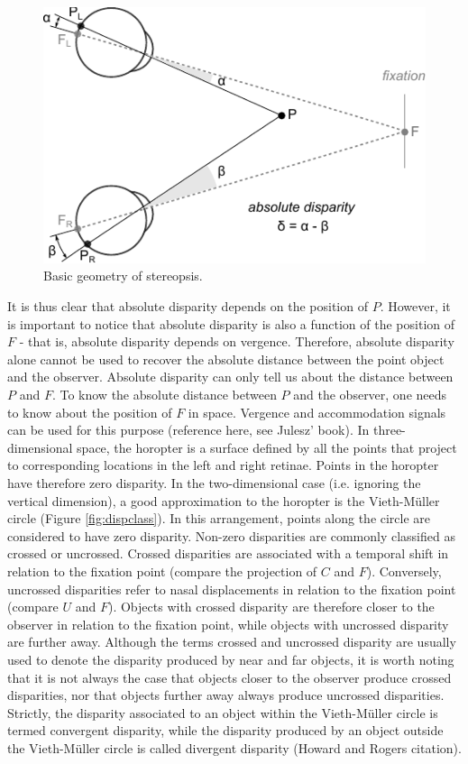 \documentclass[oneside,12pt]{classes/CUEDthesisPSnPDF}
\begin{document}
\begin{figure}
  \centering
  \includegraphics{absolute-disparity}
  \caption{Basic geometry of stereopsis.}
  \label{fig:geostereo}
\end{figure}

It is thus clear that absolute disparity depends on the position of $P$. However, it is important to notice that absolute disparity is also a function of the position of $F$ - that is, absolute disparity depends on vergence. Therefore, absolute disparity alone cannot be used to recover the absolute distance between the point object and the observer. Absolute disparity can only tell us about the distance between $P$ and $F$. To know the absolute distance between $P$ and the observer, one needs to know about the position of $F$ in space. Vergence and accommodation signals can be used for this purpose (reference here, see Julesz' book). 
In three-dimensional space, the horopter is a surface defined by all the points that project to corresponding locations in the left and right retinae. Points in the horopter have therefore zero disparity. In the two-dimensional case (i.e. ignoring the vertical dimension), a good approximation to the horopter is the Vieth-M{\"u}ller circle (Figure \ref{fig:dispclass}). In this arrangement, points along the circle are considered to have zero disparity. Non-zero disparities are commonly classified as crossed or uncrossed. Crossed disparities are associated with a temporal shift in relation to the fixation point (compare the projection of $C$ and $F$). Conversely, uncrossed disparities refer to nasal displacements in relation to the fixation point (compare $U$ and $F$). Objects with crossed disparity are therefore closer to the observer in relation to the fixation point, while objects with uncrossed disparity are further away. Although the terms crossed and uncrossed disparity are usually used to denote the disparity produced by near and far objects, it is worth noting that it is not always the case that objects closer to the observer produce crossed disparities, nor that objects further away always produce uncrossed disparities. Strictly, the disparity associated to an object within the Vieth-M{\"u}ller circle is termed convergent disparity, while the disparity produced by an object outside the Vieth-M{\"u}ller circle is called divergent disparity (Howard and Rogers citation).
\end{document}
